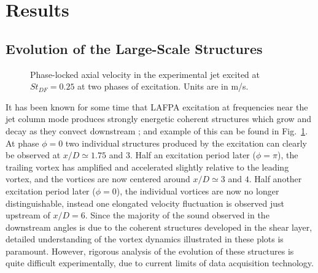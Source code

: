 \documentclass[english]{aiaa-tc}
\begin{document}
\section{Results}\label{results} 
\subsection{Evolution of the Large-Scale Structures}\label{structure}
\begin{figure}
	\centering{}
	\caption{Phase-locked axial velocity in the experimental jet excited at $St_{DF} = 0.25$ at two phases of excitation. Units are in m/s.}
	\label{Exp_Phavg_Ux}
\end{figure}
It has been known for some time that LAFPA excitation at frequencies near the jet column mode produces strongly energetic coherent structures which grow and decay as they convect downstream \cite{Samimy2012}; and example of this can be found in Fig.~\ref{Exp_Phavg_Ux}.
At phase $\phi = 0$ two individual structures produced by the excitation can clearly be observed at $x/D \simeq 1.75$ and $3$.
Half an excitation period later ($\phi = \pi$), the trailing vortex has amplified and accelerated slightly relative to the leading vortex, and the vortices are now centered around $x/D \simeq 3$ and $4$.
Half another excitation period later ($\phi = 0$), the individual vortices are now no longer distinguishable, instead one elongated velocity fluctuation is observed just upstream of $x/D = 6$.
Since the majority of the sound observed in the downstream angles is due to the coherent structures developed in the shear layer, detailed understanding of the vortex dynamics illustrated in these plots is paramount.
However, rigorous analysis of the evolution of these structures is quite difficult experimentally, due to current limits of data acquisition technology.
\end{document}
